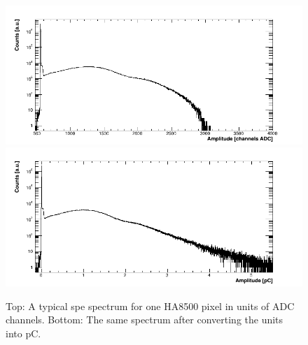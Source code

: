\begin{figure}[hbt!]
	\centering
	\includegraphics[width=\linewidth]{figures/CA7811_w1_g064_v1100_056_adc.png}
	\includegraphics[width=\linewidth]{figures/CA7811_w1_g064_v1100_056_pC.png}	
	\caption{Top: A typical spe spectrum for one HA8500 pixel in units of ADC channels. Bottom: The same spectrum after converting the units into pC.}
	\label{fig:H8500calib}
\end{figure}